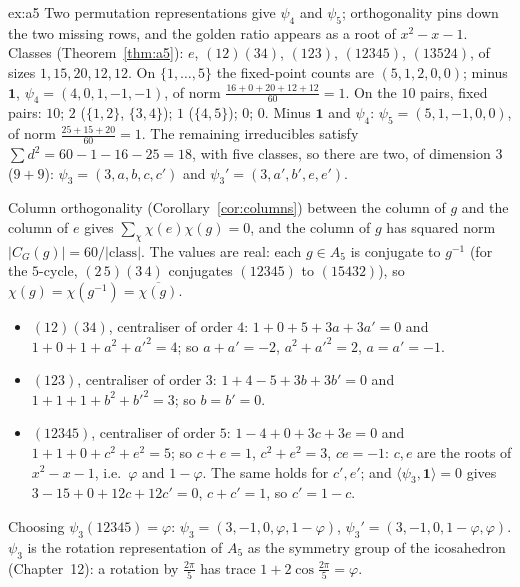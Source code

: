 \begin{solution}{ex:a5}
\idea Two permutation representations give $\psi_4$ and $\psi_5$; orthogonality pins down the two missing rows, and the golden ratio appears as a root of $x^2-x-1$.
\writeup Classes (Theorem~\ref{thm:a5}): $e$, $(12)(34)$, $(123)$, $(12345)$, $(13524)$, of sizes $1,15,20,12,12$. On $\{1,\dots,5\}$ the fixed-point counts are $(5,1,2,0,0)$; minus $\mathbf1$, $\psi_4=(4,0,1,-1,-1)$, of norm $\frac{16+0+20+12+12}{60}=1$. On the $10$ pairs, fixed pairs: $10$; $2$ ($\{1,2\}$, $\{3,4\}$); $1$ ($\{4,5\}$); $0$; $0$. Minus $\mathbf1$ and $\psi_4$: $\psi_5=(5,1,-1,0,0)$, of norm $\frac{25+15+20}{60}=1$. The remaining irreducibles satisfy $\sum d^2=60-1-16-25=18$, with five classes, so there are two, of dimension $3$ ($9+9$): $\psi_3=(3,a,b,c,c')$ and $\psi_3'=(3,a',b',e,e')$.

Column orthogonality (Corollary~\ref{cor:columns}) between the column of $g$ and the column of $e$ gives $\sum_\chi\chi(e)\chi(g)=0$, and the column of $g$ has squared norm $|C_G(g)|=60/|\text{class}|$. The values are real: each $g\in A_5$ is conjugate to $g^{-1}$ (for the $5$-cycle, $(2\,5)(3\,4)$ conjugates $(12345)$ to $(15432)$), so $\chi(g)=\chi(g^{-1})=\overline{\chi(g)}$.
\begin{itemize}
\item $(12)(34)$, centraliser of order $4$: $1+0+5+3a+3a'=0$ and $1+0+1+a^2+a'^2=4$; so $a+a'=-2$, $a^2+a'^2=2$, $a=a'=-1$.
\item $(123)$, centraliser of order $3$: $1+4-5+3b+3b'=0$ and $1+1+1+b^2+b'^2=3$; so $b=b'=0$.
\item $(12345)$, centraliser of order $5$: $1-4+0+3c+3e=0$ and $1+1+0+c^2+e^2=5$; so $c+e=1$, $c^2+e^2=3$, $ce=-1$: $c,e$ are the roots of $x^2-x-1$, i.e.\ $\varphi$ and $1-\varphi$. The same holds for $c',e'$; and $\langle\psi_3,\mathbf1\rangle=0$ gives $3-15+0+12c+12c'=0$, $c+c'=1$, so $c'=1-c$.
\end{itemize}
Choosing $\psi_3(12345)=\varphi$: $\psi_3=(3,-1,0,\varphi,1-\varphi)$, $\psi_3'=(3,-1,0,1-\varphi,\varphi)$. $\psi_3$ is the rotation representation of $A_5$ as the symmetry group of the icosahedron (Chapter~12): a rotation by $\frac{2\pi}5$ has trace $1+2\cos\frac{2\pi}5=\varphi$.
\end{solution}

